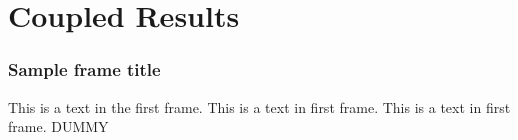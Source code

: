 \section{Coupled Results}
\label{sec:coupledResults}

\begin{frame}
  \frametitle{Sample frame title}
  This is a text in the first frame. This is a text in first frame. This is a
  text in first frame. DUMMY
\end{frame}
